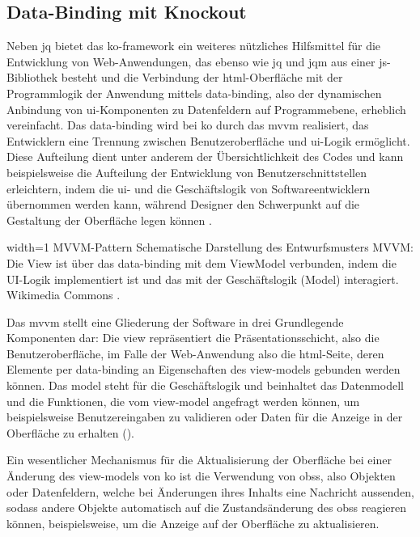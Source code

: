\subsection{Data-Binding mit Knockout} \label{sec:ko}
Neben \gls{jq} bietet das \gls{ko}-\gls{framework} ein weiteres nützliches Hilfsmittel für die Entwicklung von Web-Anwendungen, das ebenso wie \gls{jq} und \gls{jqm} aus einer \gls{js}-Bibliothek besteht und die Verbindung der \gls{html}-Oberfläche mit der Programmlogik der Anwendung mittels \gls{data-binding}, also der dynamischen Anbindung von \gls{ui}-Komponenten zu Datenfeldern auf Programmebene, erheblich vereinfacht.
Das \gls{data-binding} wird bei \gls{ko} durch das \gls{mvvm} realisiert, das Entwicklern eine Trennung zwischen Benutzeroberfläche und \gls{ui}-Logik ermöglicht.
Diese Aufteilung dient unter anderem der Übersichtlichkeit des Codes und kann beispielsweise die Aufteilung der Entwicklung von Benutzerschnittstellen erleichtern, indem die \gls{ui}- und die Geschäftslogik von Softwareentwicklern übernommen werden kann, während Designer den Schwerpunkt auf die Gestaltung der Oberfläche legen können \cite{Model_View_ViewModel__Wikipedia}.

	{width=1\textwidth}
	{MVVM-Pattern}
		{Schematische Darstellung des Entwurfsmusters MVVM: Die View ist über das \gls{data-binding} mit dem ViewModel verbunden, indem die UI-Logik implementiert ist und das mit der Geschäftslogik (Model) interagiert.}
	{Wikimedia Commons \cite{MVVMPattern}.}

Das \gls{mvvm} stellt eine Gliederung der Software in drei Grundlegende Komponenten dar:
Die \gls{view} repräsentiert die Präsentationsschicht, also die Benutzeroberfläche, im Falle der Web-Anwendung also die \gls{html}-Seite, deren Elemente per \gls{data-binding} an Eigenschaften des \glspl{view-model} gebunden werden können. 
Das \gls{model} steht für die Geschäftslogik und beinhaltet das Datenmodell und die Funktionen, die vom \gls{view-model} angefragt werden können, um beispielsweise Benutzereingaben zu validieren oder Daten für die Anzeige in der Oberfläche zu erhalten ().

Ein wesentlicher Mechanismus für die Aktualisierung der Oberfläche bei einer Änderung des \glspl{view-model} von \gls{ko} ist die Verwendung von \glspl{obs}, also Objekten oder Datenfeldern, welche bei Änderungen ihres Inhalts eine Nachricht aussenden, sodass andere Objekte automatisch auf die Zustandsänderung des \glspl{obs} reagieren können, beispielsweise, um die Anzeige auf der Oberfläche zu aktualisieren.

